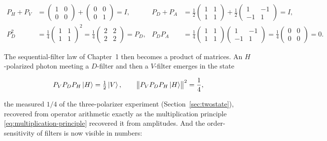 \begin{linenomath}
\begin{align}
    P_H+P_V &= \begin{pmatrix}1&0\\0&0\end{pmatrix}+\begin{pmatrix}0&0\\0&1\end{pmatrix}=I, &
    P_D+P_A &= \frac12\begin{pmatrix}1&1\\1&1\end{pmatrix}+\frac12\begin{pmatrix}1&-1\\-1&1\end{pmatrix}=I,\\
    P_D^2 &= \frac14\begin{pmatrix}1&1\\1&1\end{pmatrix}^{\!2}
           =\frac14\begin{pmatrix}2&2\\2&2\end{pmatrix}=P_D, &
    P_D P_A &= \frac14\begin{pmatrix}1&1\\1&1\end{pmatrix}\begin{pmatrix}1&-1\\-1&1\end{pmatrix}
            =\frac14\begin{pmatrix}0&0\\0&0\end{pmatrix}=0 .
\end{align}
\end{linenomath}
The sequential-filter law of Chapter~1 then becomes a product of matrices. An $H$-polarized photon meeting a $D$-filter and then a $V$-filter emerges in the state
\begin{linenomath}
    \begin{equation}
        P_V P_D P_H\ket{H} = \tfrac12\ket{V},
        \qquad
        \bigl\|P_V P_D P_H\ket{H}\bigr\|^2 = \frac14 ,
    \end{equation}
\end{linenomath}
the measured $1/4$ of the three-polarizer experiment (Section~\ref{sec:twostate}), recovered from operator arithmetic exactly as the multiplication principle \eqref{eq:multiplication-principle} recovered it from amplitudes. And the order-sensitivity of filters is now visible in numbers:
